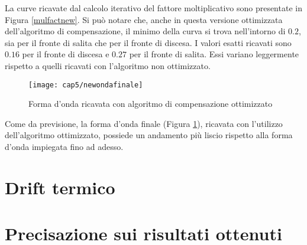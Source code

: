 La curve ricavate dal calcolo iterativo del fattore moltiplicativo sono presentate in Figura \ref{mulfactnew}. Si può notare che, anche in questa versione ottimizzata dell'algoritmo di compensazione, il minimo della curva si trova nell'intorno di $0.2$, sia per il fronte di salita che per il fronte di discesa. I valori esatti ricavati sono $0.16$ per il fronte di discesa e $0.27$ per il fronte di salita. Essi variano leggermente rispetto a quelli ricavati con l'algoritmo non ottimizzato. 
\begin{figure}  
  \begin{center}
    \texttt{[image: cap5/newondafinale]}
    \caption{Forma d'onda ricavata con algoritmo di compensazione ottimizzato}
    \label{newondafinale}
  \end{center}
\end{figure}

Come da previsione, la forma d'onda finale (Figura \ref{newondafinale}), ricavata con l'utilizzo dell'algoritmo ottimizzato, possiede un andamento più liscio rispetto alla forma d'onda impiegata fino ad adesso.



\section{Drift termico}

\section{Precisazione sui risultati ottenuti}